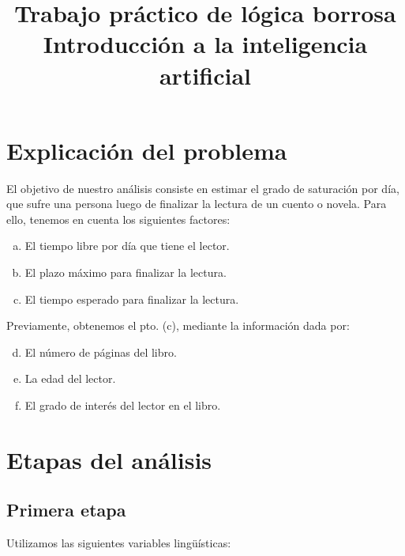 \documentclass[a4paper, 8pt]{article}
\title{Trabajo práctico de lógica borrosa \\ Introducción a la inteligencia artificial}
\date{}
\begin{document}
\maketitle
\section{Explicación del problema}

	El objetivo de nuestro análisis consiste en estimar el grado de saturación por día, que sufre una persona luego de finalizar la lectura de un cuento o novela. Para ello, tenemos en cuenta los siguientes factores:
\begin{enumerate}[a)]
  \item El tiempo libre por día que tiene el lector.
  \item El plazo máximo para finalizar la lectura.
  \item El tiempo esperado para finalizar la lectura.
\end{enumerate}

Previamente, obtenemos el pto. (c), mediante la información dada por:
\begin{enumerate}[a)]
\setcounter{enumi}{3}
  \item El número de páginas del libro.
  \item La edad del lector.
  \item El grado de interés del lector en el libro.
\end{enumerate}

\section{Etapas del análisis}

\subsection{Primera etapa}

Utilizamos las siguientes variables lingüísticas:
\end{document}
